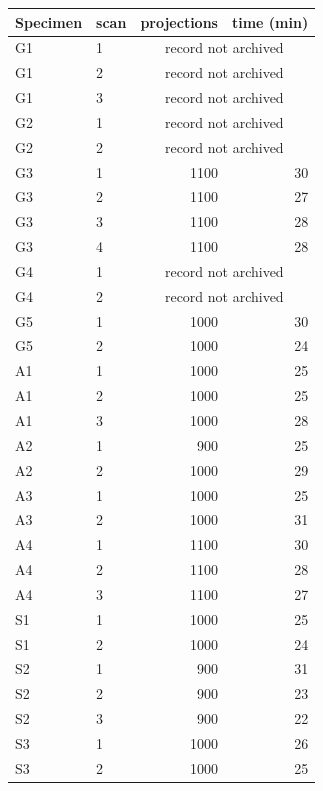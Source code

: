 \begin{tabular}{llrr}
\toprule
Specimen & scan & projections & time (min) \\
\midrule
G1 & 1 & \multicolumn{2}{c}{record not archived} \\
G1 & 2 & \multicolumn{2}{c}{record not archived} \\
G1 & 3 & \multicolumn{2}{c}{record not archived} \\
G2 & 1 & \multicolumn{2}{c}{record not archived} \\
G2 & 2 & \multicolumn{2}{c}{record not archived} \\
G3 & 1 & 1100 & 30 \\
G3 & 2 & 1100 & 27 \\
G3 & 3 & 1100 & 28 \\
G3 & 4 & 1100 & 28 \\
G4 & 1 & \multicolumn{2}{c}{record not archived} \\
G4 & 2 & \multicolumn{2}{c}{record not archived} \\
G5 & 1 & 1000 & 30 \\
G5 & 2 & 1000 & 24 \\
A1 & 1 & 1000 & 25 \\
A1 & 2 & 1000 & 25 \\
A1 & 3 & 1000 & 28 \\
A2 & 1 & 900 & 25 \\
A2 & 2 & 1000 & 29 \\
A3 & 1 & 1000 & 25 \\
A3 & 2 & 1000 & 31 \\
A4 & 1 & 1100 & 30 \\
A4 & 2 & 1100 & 28 \\
A4 & 3 & 1100 & 27 \\
S1 & 1 & 1000 & 25 \\
S1 & 2 & 1000 & 24 \\
S2 & 1 & 900 & 31 \\
S2 & 2 & 900 & 23 \\
S2 & 3 & 900 & 22 \\
S3 & 1 & 1000 & 26 \\
S3 & 2 & 1000 & 25 \\
\bottomrule
\end{tabular}
